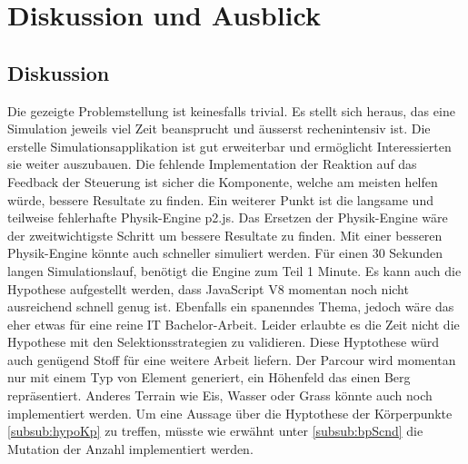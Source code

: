 %
%


\chapter{Diskussion und Ausblick}

  \section{Diskussion}
    Die gezeigte Problemstellung ist keinesfalls trivial. Es stellt sich heraus, das eine Simulation jeweils viel Zeit beansprucht
    und äusserst rechenintensiv ist.
    Die erstelle Simulationsapplikation ist gut erweiterbar und ermöglicht Interessierten sie weiter auszubauen.
    Die fehlende Implementation der Reaktion auf das Feedback der Steuerung ist sicher die Komponente,
    welche am meisten helfen würde, bessere Resultate zu finden.
    Ein weiterer Punkt ist die langsame und teilweise fehlerhafte Physik-Engine p2.js.
    Das Ersetzen der Physik-Engine wäre der zweitwichtigste Schritt um bessere Resultate zu finden.
    Mit einer besseren Physik-Engine könnte auch schneller simuliert werden.
    Für einen 30 Sekunden langen Simulationslauf, benötigt die Engine zum Teil 1 Minute.
    Es kann auch die Hypothese aufgestellt werden, dass JavaScript V8 momentan noch nicht ausreichend schnell genug ist.
    Ebenfalls ein spanenndes Thema, jedoch wäre das eher etwas für eine reine IT Bachelor-Arbeit.
    Leider erlaubte es die Zeit nicht die Hypothese mit den Selektionsstrategien zu validieren.
    Diese Hyptothese würd auch genügend Stoff für eine weitere Arbeit liefern.
    Der Parcour wird momentan nur mit einem Typ von Element generiert, ein Höhenfeld das einen Berg repräsentiert.
    Anderes Terrain wie Eis, Wasser oder Grass könnte auch noch implementiert werden.
    Um eine Aussage über die Hyptothese der Körperpunkte \ref{subsub:hypoKp} zu treffen,
    müsste wie erwähnt unter \ref{subsub:bpScnd} die Mutation der Anzahl implementiert werden.
